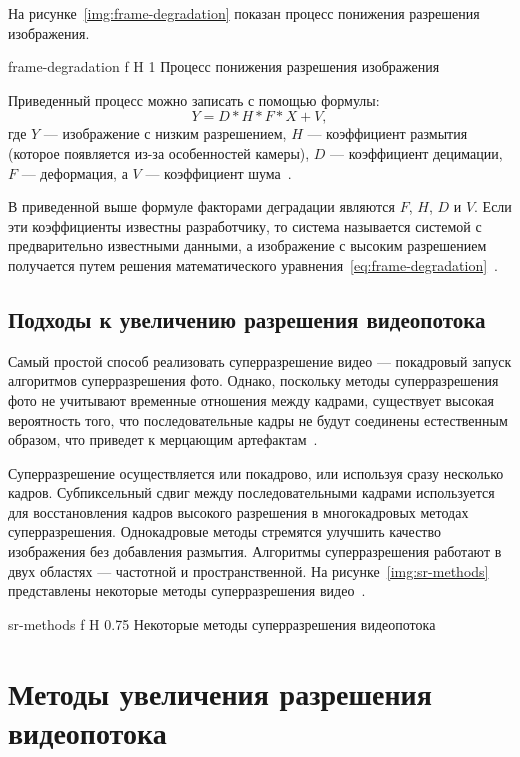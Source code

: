 \documentclass{bmstu}
\begin{document}
На рисунке~\ref{img:frame-degradation} показан процесс понижения разрешения изображения.

    {frame-degradation}
    {f}
    {H}
    {1\textwidth}
    {Процесс понижения разрешения изображения~\cite{Daithankar2021}}
    
Приведенный процесс можно записать с помощью формулы:
\begin{equation} 
\label{eq:frame-degradation}
Y = D * H * F * X + V,
\end{equation}
где $Y$ --- изображение с низким разрешением, $H$ --- коэффициент размытия (которое появляется из-за особенностей камеры), $D$ --- коэффициент децимации, $F$ --- деформация, а $V$ --- коэффициент шума~\cite{Daithankar2021}.

В приведенной выше формуле факторами деградации являются $F$, $H$, $D$ и $V$. 
Если эти коэффициенты известны разработчику, то система называется системой с предварительно известными данными, а изображение с высоким разрешением получается путем решения математического уравнения~\ref{eq:frame-degradation}~\cite{Daithankar2021}.

\section{Подходы к увеличению разрешения видеопотока}

Самый простой способ реализовать суперразрешение видео --- покадровый запуск алгоритмов суперразрешения фото. 
Однако, поскольку методы суперразрешения фото не учитывают временные отношения между кадрами, существует высокая вероятность того, что последовательные кадры не будут соединены естественным образом, что приведет к мерцающим артефактам~\cite{Younghyun2018}.

Суперразрешение осуществляется или покадрово, или используя сразу несколько кадров. 
Субпиксельный сдвиг между последовательными кадрами используется для восстановления кадров высокого разрешения в многокадровых методах суперразрешения. 
Однокадровые методы стремятся улучшить качество изображения без добавления размытия. 
Алгоритмы суперразрешения работают в двух областях --- частотной и пространственной. 
На рисунке~\ref{img:sr-methods} представлены некоторые методы суперразрешения видео~\cite{Daithankar2021}.

    {sr-methods}
    {f}
    {H}
    {0.75\textwidth}
    {Некоторые методы суперразрешения видеопотока~\cite{Daithankar2021}}

\chapter{Методы увеличения разрешения видеопотока}
\end{document}
